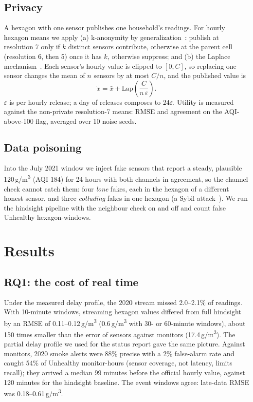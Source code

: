 \documentclass[10pt,journal,compsoc]{IEEEtran}
\newcommand{\ugm}{\,\textmu g/m\textsuperscript{3}}
\begin{document}
\subsection{Privacy}
A hexagon with one sensor publishes one household's readings. For hourly hexagon means we apply (a) k-anonymity by generalization~\cite{sweeney2002}: publish at resolution 7 only if $k$ distinct sensors contribute, otherwise at the parent cell (resolution 6, then 5) once it has $k$, otherwise suppress; and (b) the Laplace mechanism~\cite{dwork2006}. Each sensor's hourly value is clipped to $[0, C]$, so replacing one sensor changes the mean of $n$ sensors by at most $C/n$, and the published value is
\begin{equation}
\tilde x = \bar x + \text{Lap}\!\left(\frac{C}{n\,\varepsilon}\right).
\end{equation}
$\varepsilon$ is per hourly release; a day of releases composes to $24\varepsilon$. Utility is measured against the non-private resolution-7 means: RMSE and agreement on the AQI-above-100 flag, averaged over 10 noise seeds.

\subsection{Data poisoning}
Into the July 2021 window we inject fake sensors that report a steady, plausible 120\ugm{} (AQI 184) for 24 hours with both channels in agreement, so the channel check cannot catch them: four \emph{lone} fakes, each in the hexagon of a different honest sensor, and three \emph{colluding} fakes in one hexagon (a Sybil attack~\cite{douceur2002}). We run the hindsight pipeline with the neighbour check on and off and count false Unhealthy hexagon-windows.

\section{Results}
\subsection{RQ1: the cost of real time}
Under the measured delay profile, the 2020 stream missed 2.0--2.1\% of readings. With 10-minute windows, streaming hexagon values differed from full hindsight by an RMSE of 0.11--0.12\ugm{} (0.6\ugm{} with 30- or 60-minute windows), about 150 times smaller than the error of sensors against monitors (17.4\ugm). The partial delay profile we used for the status report gave the same picture. Against monitors, 2020 smoke alerts were 88\% precise with a 2\% false-alarm rate and caught 54\% of Unhealthy monitor-hours (sensor coverage, not latency, limits recall); they arrived a median 99 minutes before the official hourly value, against 120 minutes for the hindsight baseline. The event windows agree: late-data RMSE was 0.18--0.61\ugm.
\end{document}
